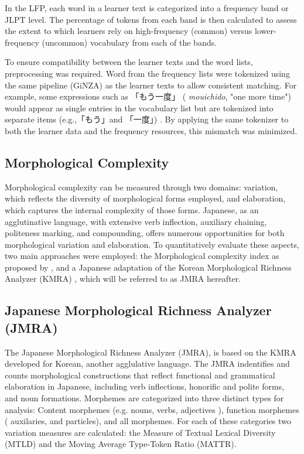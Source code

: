 In the LFP, each word in a learner text is categorized into a frequency band or JLPT level. The percentage of tokens
from each band is then calculated to assess the extent to which learners rely on high-frequency (common) versus
lower-frequency (uncommon) vocabulary from
each of the bands.

To ensure compatibility between the learner texts and the word lists, preprocessing was required. Word from the
frequency lists were tokenized using the same pipeline (GiNZA) as the learner texts to allow consistent matching.
 For example, some expressions such as
「もう一度」 (
\textit{mouichido}, "one more time") would appear as single entries in the vocabulary list but are tokenized
into separate
items (e.g.,「もう」and 「一度」) . By applying the same tokenizer to both the learner data and the frequency resources, this
mismatch was minimized.


\subsection{Morphological Complexity}
Morphological complexity can be measured through two domains: variation, which reflects the diversity of morphological
forms employed, and
elaboration, which captures the internal complexity of those forms. Japanese, as an
agglutinative
language, with extensive verb inflection, auxiliary chaining, politeness marking, and compounding,
offers
numerous opportunities for both morphological variation and elaboration. To quantitatively evaluate these aspects, two
main
approaches were employed: the Morphological complexity index as proposed by
\citet{Brezina2019}, and a Japanese adaptation of the Korean Morphological Richness Analyzer (KMRA) \citet{Hwang2024}, which will be
referred to as
JMRA hereafter.


\subsection{Japanese Morphological Richness Analyzer (JMRA)}

The Japanese Morphological Richness Analyzer (JMRA), is based on the KMRA developed for Korean, another
agglulative language. The JMRA indentifies and counts morphological constructions that reflect
functional and grammatical elaboration in Japanese, including verb inflections, honorific and polite forms, and noun
formations.
Morphemes
are categorized into three distinct types for analysis: Content morphemes (e.g. nouns, verbs, adjectives ),
function
morphemes (
auxilaries, and particles), and all morphemes. For each of these categories two variation measures are
calculated: the
Measure of Textual Lexical Diversity (MTLD) and the Moving Average Type-Token Ratio (MATTR).

